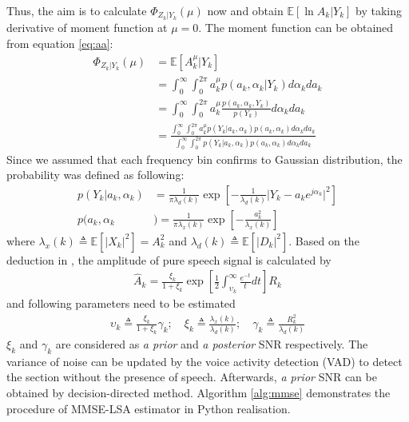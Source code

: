 Thus, the aim is to calculate $\Phi_{Z_k|Y_k}(\mu)$ now and obtain $\mathbb{E}\left[\ln A_k | Y_k\right]$ by taking derivative of moment function at $\mu=0$. The moment function can be obtained from equation \ref{eq:aa}:
\begin{align}
\Phi_{Z_k|Y_k}(\mu)&=\mathbb{E}\left[A_k^\mu\vert Y_k\right] \\
&=\int_0^{\infty}\int_0^{2\pi}a_k^\mu p(a_k,\alpha_k\vert Y_k)d\alpha_k d a_k \\
&= \int_0^{\infty}\int_0^{2\pi}a_k^\mu \frac{p(a_k,\alpha_k,Y_k)}{p(Y_k)}d\alpha_k d a_k \\
&=\frac{ \int_0^{\infty}\int_0^{2\pi}a_k^\mu p(Y_k\vert a_k,\alpha_k) p(a_k,\alpha_k) d\alpha_k d a_k }{ \int_0^{\infty}\int_0^{2\pi} p(Y_k\vert a_k,\alpha_k) p(a_k,\alpha_k) d\alpha_k d a_k }
\end{align}
Since we assumed that each frequency bin confirms to Gaussian distribution, the probability was defined as following:
\begin{align}
p(Y_k\vert a_k,\alpha_k)&=\frac{1}{\pi\lambda_d (k)}\exp\left[ -\frac{1}{\lambda_d (k)}\vert Y_k - a_k e^{j\alpha_k} \vert^2 \right] \\
p(a_k,\alpha_k&)=\frac{1}{\pi\lambda_x (k)}\exp\left[-\frac{a_k^2}{\lambda_x (k)}\right]
\end{align}
where $\lambda_x (k)\triangleq \mathbb{E}\left[\vert X_k \vert ^2\right]=A_k^2 $ and $\lambda_d (k)\triangleq\mathbb{E}\left[\vert D_k \vert ^2\right]$. 
Based on the deduction in \cite{ephraim1985speech}, the amplitude of pure speech signal is calculated by
\begin{align}
\hat{A}_k=\frac{\xi_k}{1+\xi_k}\exp\left[\frac{1}{2}\int_{\upsilon_k}^{\infty}\frac{e^{-t}}{t}dt\right]R_k
\label{eq:magni}
\end{align}
and following parameters need to be estimated
\begin{align}
\upsilon_k\triangleq \frac{\xi_k}{1+\xi_k}\gamma_k;\quad
\xi_k\triangleq\frac{\lambda_x (k)}{\lambda_d (k)};\quad
\gamma_k\triangleq\frac{R_k^2}{\lambda_d (k)}
\label{eq:snr}
\end{align}
$\xi_k$ and $\gamma_k$ are considered as \textit{a prior} and \textit{a posterior} SNR respectively. The variance of noise can be updated by the voice activity detection (VAD) to detect the section without the presence of speech. Afterwards, \textit{a prior} SNR can be obtained by decision-directed method. Algorithm \ref{alg:mmse} demonstrates the procedure of MMSE-LSA estimator in Python realisation.\par
